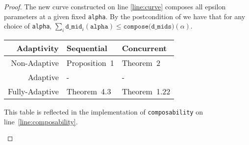 \documentclass{article}
\begin{document}
\begin{proof}
  The new curve constructed on line \ref{line:curve} composes all epsilon parameters at a given fixed \texttt{alpha}.
  By the postcondition of  we have that for any choice of \texttt{alpha}, $\sum_i \texttt{d\_mid}_i(\texttt{alpha}) \le \texttt{compose(d\_mids)}(\alpha)$.

  \begin{center}
    \begin{tabular}{ r | l l }
      Adaptivity & Sequential & Concurrent \\ 
      \hline
      Non-Adaptive & Proposition~1\cite{mironov2017renyi} & Theorem~2\cite{lyu2022interactive} \\  
      Adaptive & - & - \\
      Fully-Adaptive & Theorem~4.3\cite{feldman2022individual} & Theorem~1.22\cite{vadhan2021concurrent}
    \end{tabular}

    This table is reflected in the implementation of \texttt{composability} on line~\ref{line:composability}.
  \end{center}
  
\end{proof}



\end{document}
